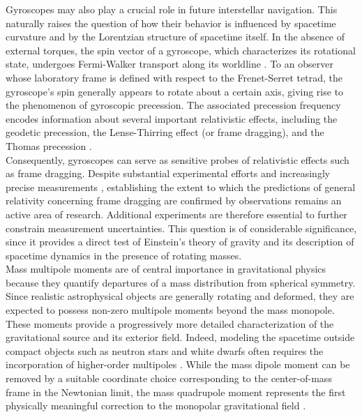 \documentclass[12pt]{article}
\begin{document}
Gyroscopes may also play a crucial role in future interstellar navigation. This naturally raises the question of how their behavior is influenced by spacetime curvature and by the Lorentzian structure of spacetime itself. In the absence of external torques, the spin vector of a gyroscope, which characterizes its rotational state, undergoes Fermi-Walker transport along its worldline \cite{straumann2004general, misner2017gravitation}. To an observer whose laboratory frame is defined with respect to the Frenet-Serret tetrad, the gyroscope's spin generally appears to rotate about a certain axis, giving rise to the phenomenon of gyroscopic precession. The associated precession frequency encodes information about several important relativistic effects, including the geodetic precession, the Lense-Thirring effect (or frame dragging), and the Thomas precession \cite{semerak1996forces}.\\

Consequently, gyroscopes can serve as sensitive probes of relativistic effects such as frame dragging. Despite substantial experimental efforts and increasingly precise measurements \cite{ciufolini2026lares, everitt2011gravity, ciufolini2004confirmation}, establishing the extent to which the predictions of general relativity concerning frame dragging are confirmed by observations remains an active area of research. Additional experiments are therefore essential to further constrain measurement uncertainties. This question is of considerable significance, since it provides a direct test of Einstein’s theory of gravity and its description of spacetime dynamics in the presence of rotating masses.\\

Mass multipole moments are of central importance in gravitational physics because they quantify departures of a mass distribution from spherical symmetry. Since realistic astrophysical objects are generally rotating and deformed, they are expected to possess non-zero multipole moments beyond the mass monopole. These moments provide a progressively more detailed characterization of the gravitational source and its exterior field. Indeed, modeling the spacetime outside compact objects such as neutron stars and white dwarfs often requires the incorporation of higher-order multipoles \cite{quevedo2016quadrupolar}. While the mass dipole moment can be removed by a suitable coordinate choice corresponding to the center-of-mass frame in the Newtonian limit, the mass quadrupole moment represents the first physically meaningful correction to the monopolar gravitational field \cite{quevedo2016quadrupolar}.\\
\end{document}
